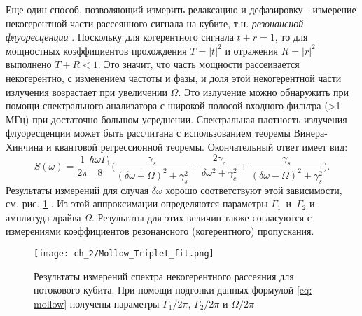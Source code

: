 Еще один способ, позволяющий измерить релаксацию и дефазировку - измерение некогерентной части рассеянного сигнала на кубите, т.н. \textit{резонансной флуоресценции} \cite{Astafiev2010resonance,Mollow}. Поскольку для когерентного сигнала $t+r=1$, то для мощностных коэффициентов прохождения $T=|t|^2$ и отражения $R=|r|^2$ выполнено $T+R <1$. Это значит, что часть мощности рассеивается некогерентно, с изменением частоты и фазы, и доля этой некогерентной части излучения возрастает при увеличении $\Omega$.  Это излучение можно обнаружить при помощи спектрального анализатора с широкой полосой входного фильтра (>1 МГц) при достаточно большом усреднении. Спектральная плотность излучения флуоресценции может быть рассчитана с использованием теоремы Винера-Хинчина и квантовой регрессионной теоремы. Окончательный ответ \cite{Astafiev2010resonance, abdumalikov2011dynamics} имеет вид:
\begin{equation}
S(\omega) = \frac{1}{2\pi}\frac{\hbar \omega\Gamma_1}{8}\Big(\frac{\gamma_s}{(\delta\omega+\Omega)^2+\gamma_s^2}+\frac{2\gamma_c}{\delta\omega^2+\gamma_c^2}+\frac{\gamma_s}{(\delta\omega-\Omega)^2+\gamma_s^2}\Big).
\label{eq: mollow}
\end{equation}
Результаты измерений для случая $\delta\omega$ хорошо соответствуют этой зависимости, см. рис. \ref{fig: mollow} .  Из этой аппроксимации определяются параметры $\Gamma_1$~и~$\Gamma_2$ и амплитуда драйва $\Omega$. Результаты для этих величин также согласуются с измерениями коэффициентов резонансного (когерентного) пропускания.  
\begin{figure}[htb]\center
	\texttt{[image: ch\_2/Mollow\_Triplet\_fit.png]} \hfill
	\caption[width=0.6\textwidth]{Результаты измерений спектра некогерентного рассеяния для потокового кубита. При помощи подгонки данных формулой \eqref{eq: mollow} получены параметры $\Gamma_1/2\pi$, $\Gamma_2/2\pi$ и $\Omega/2\pi$ }
	\label{fig: mollow}
\end{figure}
